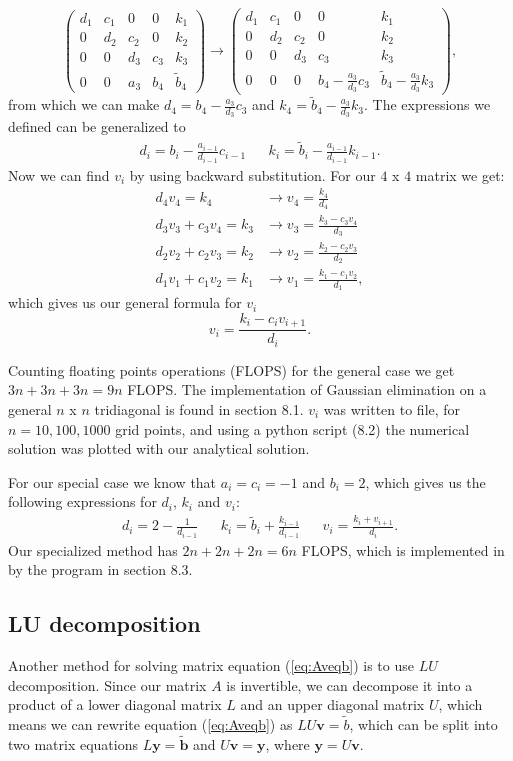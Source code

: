 \documentclass[norsk,a4paper,12pt]{article}
\begin{document}
$$\begin{pmatrix}
d_1&c_1&0&0&k_1\\
0&d_2&c_2&0&k_2\\
0&0&d_3&c_3&k_3\\
0&0&a_3&b_4&\tilde{b}_4
\end{pmatrix}\rightarrow \begin{pmatrix}
d_1&c_1&0&0&k_1\\
0&d_2&c_2&0&k_2\\
0&0&d_3&c_3&k_3\\
0&0&0&b_4-\frac{a_3}{d_3}c_3&\tilde{b}_4-\frac{a_3}{d_3}k_3
\end{pmatrix},$$
from which we can make $d_4=b_4-\frac{a_3}{d_3}c_3$ and $k_4 = \tilde{b}_4-\frac{a_3}{d_3}k_3$. The expressions we defined can be generalized to \begin{align*}
d_i=b_i-\frac{a_{i-1}}{d_{i-1}}c_{i-1} && k_i=\tilde{b}_i-\frac{a_{i-1}}{d_{i-1}}k_{i-1}.
\end{align*}
Now we can find $v_i$ by using backward substitution. For our $4$ x $4$ matrix we get:
\begin{align*}
d_4v_4=k_4 &\rightarrow v_4 = \frac{k_4}{d_4} \\
d_3v_3+c_3v_4 = k_3 &\rightarrow v_3=\frac{k_3-c_3v_4}{d_3} \\
d_2v_2+c_2v_3 = k_2 &\rightarrow v_2=\frac{k_2-c_2v_3}{d_2} \\
d_1v_1+c_1v_2 = k_1 &\rightarrow v_1=\frac{k_1-c_1v_2}{d_1},
\end{align*}
which gives us our general formula for $v_i$
$$v_i=\frac{k_i-c_iv_{i+1}}{d_i}.$$

Counting floating points operations (FLOPS) for the general case we get $3n+3n+3n=9n$ FLOPS. The implementation of Gaussian elimination on a general $n$ x $n$ tridiagonal is found in section 8.1. $v_i$ was written to file, for $n=10,100,1000$ grid points, and using a python script (8.2) the numerical solution was plotted with our analytical solution. 

For our special case we know that $a_i=c_i=-1$ and $b_i=2$, which gives us the following expressions for $d_i$, $k_i$ and $v_i$:
\begin{align*}
d_i = 2-\frac{1}{d_{i-1}} && k_i = \tilde{b}_i + \frac{k_{i-1}}{d_{i-1}} && v_i = \frac{k_i+v_{i+1}}{d_i}.
\end{align*}
Our specialized method has $2n+2n+2n=6n$ FLOPS, which is implemented in by the program in section 8.3.

\subsection{LU decomposition}
Another method for solving matrix equation (\ref{eq:Aveqb}) is to use $LU$ decomposition. Since our matrix $A$ is invertible, we can decompose it into a product of a lower diagonal matrix $L$ and an upper diagonal matrix $U$, which means we can rewrite equation (\ref{eq:Aveqb}) as $LU\textbf{v} = \tilde{b}$, which can be split into two matrix equations $L\textbf{y} = \tilde{\textbf{b}}$ and $U\textbf{v} = \textbf{y}$, where $\textbf{y} = U\textbf{v}$. 
\end{document}
